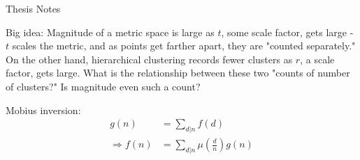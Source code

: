 \documentclass{article}
\begin{document}
\begin{center}{\Large Thesis Notes}\\ \vspace{1 ex} \end{center}


\vspace{2 ex}
\noindent

Big idea: Magnitude of a metric space is large as $t$, some scale factor, gets large - $t$ scales the metric, and as points get farther apart, they are "counted separately." On the other hand, hierarchical clustering records fewer clusters as $r$, a scale factor, gets large. What is the relationship between these two "counts of number of clusters?" Is magnitude even such a count?

Mobius inversion:
\begin{align*}
g(n) &= \sum_{d | n} f(d) \\
\Rightarrow f(n) &= \sum_{d | n} \mu(\frac dn) g(n)
\end{align*}
\end{document}
